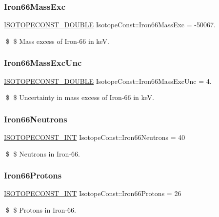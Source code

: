 \subsubsection{\texorpdfstring{Iron66\+Mass\+Exc}{Iron66MassExc}}
{\footnotesize\ttfamily \mbox{\hyperlink{group___isotope_const-_macros_ga8f45a7272ce02c0b4c65c44636ed719a}{I\+S\+O\+T\+O\+P\+E\+C\+O\+N\+S\+T\+\_\+\+D\+O\+U\+B\+LE}} Isotope\+Const\+::\+Iron66\+Mass\+Exc = -\/50067.}

\$ \$ Mass excess of Iron-\/66 in keV. \mbox{\label{group___isotope_const-_iron-_fe66_ga74d8abcc0e1983f857c2617d2bfb9e94}} 
\subsubsection{\texorpdfstring{Iron66\+Mass\+Exc\+Unc}{Iron66MassExcUnc}}
{\footnotesize\ttfamily \mbox{\hyperlink{group___isotope_const-_macros_ga8f45a7272ce02c0b4c65c44636ed719a}{I\+S\+O\+T\+O\+P\+E\+C\+O\+N\+S\+T\+\_\+\+D\+O\+U\+B\+LE}} Isotope\+Const\+::\+Iron66\+Mass\+Exc\+Unc = 4.}

\$ \$ Uncertainty in mass excess of Iron-\/66 in keV. \mbox{\label{group___isotope_const-_iron-_fe66_ga7edd69e5d4ff68b7d176dac8bd466933}} 
\subsubsection{\texorpdfstring{Iron66\+Neutrons}{Iron66Neutrons}}
{\footnotesize\ttfamily \mbox{\hyperlink{group___isotope_const-_macros_ga5f18360b3e99483a35c32d789e62621c}{I\+S\+O\+T\+O\+P\+E\+C\+O\+N\+S\+T\+\_\+\+I\+NT}} Isotope\+Const\+::\+Iron66\+Neutrons = 40}

\$ \$ Neutrons in Iron-\/66. \mbox{\label{group___isotope_const-_iron-_fe66_ga7bbd48349201aa6639c5fffc94dd66ad}} 
\subsubsection{\texorpdfstring{Iron66\+Protons}{Iron66Protons}}
{\footnotesize\ttfamily \mbox{\hyperlink{group___isotope_const-_macros_ga5f18360b3e99483a35c32d789e62621c}{I\+S\+O\+T\+O\+P\+E\+C\+O\+N\+S\+T\+\_\+\+I\+NT}} Isotope\+Const\+::\+Iron66\+Protons = 26}

\$ \$ Protons in Iron-\/66. 